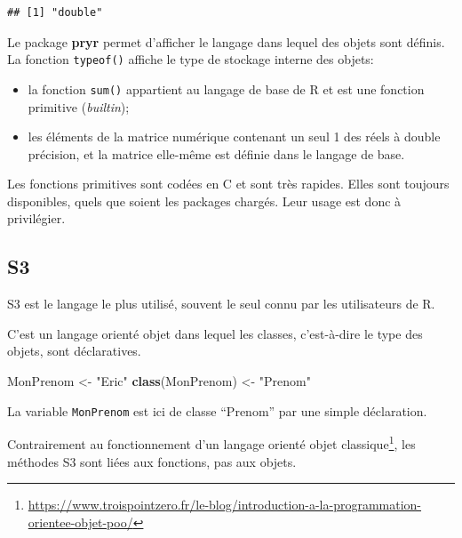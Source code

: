 \documentclass[
  12pt,
  french,
  a4paper,
  extrafontsizes,onecolumn,openright
  ]{memoir}
\newenvironment{Shaded}{\begin{snugshade}}{\end{snugshade}}
\newcommand{\KeywordTok}[1]{\textcolor[rgb]{0.13,0.29,0.53}{\textbf{#1}}}
\newcommand{\NormalTok}[1]{#1}
\newcommand{\StringTok}[1]{\textcolor[rgb]{0.31,0.60,0.02}{#1}}
\providecommand{\tightlist}{%
  \setlength{\itemsep}{0pt}\setlength{\parskip}{0pt}}
\begin{document}
\begin{verbatim}
## [1] "double"
\end{verbatim}

\normalsize

Le package \textbf{pryr} permet d'afficher le langage dans lequel des objets sont définis.
La fonction \texttt{typeof()} affiche le type de stockage interne des objets:

\begin{itemize}
\tightlist
\item
  la fonction \texttt{sum()} appartient au langage de base de R et est une fonction primitive (\emph{builtin});
\item
  les éléments de la matrice numérique contenant un seul 1 des réels à double précision, et la matrice elle-même est définie dans le langage de base.
\end{itemize}

Les fonctions primitives sont codées en C et sont très rapides.
Elles sont toujours disponibles, quels que soient les packages chargés.
Leur usage est donc à privilégier.

\hypertarget{sec:S3}{%
\subsection{S3}\label{sec:S3}}

S3 est le langage le plus utilisé, souvent le seul connu par les utilisateurs de R.

C'est un langage orienté objet dans lequel les classes, c'est-à-dire le type des objets, sont déclaratives.

\scriptsize

\begin{Shaded}
\begin{Highlighting}[]
\NormalTok{MonPrenom <-}\StringTok{ "Eric"}
\KeywordTok{class}\NormalTok{(MonPrenom) <-}\StringTok{ "Prenom"}
\end{Highlighting}
\end{Shaded}

\normalsize

La variable \texttt{MonPrenom} est ici de classe \enquote{Prenom} par une simple déclaration.

Contrairement au fonctionnement d'un langage orienté objet classique\footnote{\url{https://www.troispointzero.fr/le-blog/introduction-a-la-programmation-orientee-objet-poo/}}, les méthodes S3 sont liées aux fonctions, pas aux objets.

\scriptsize
\end{document}
